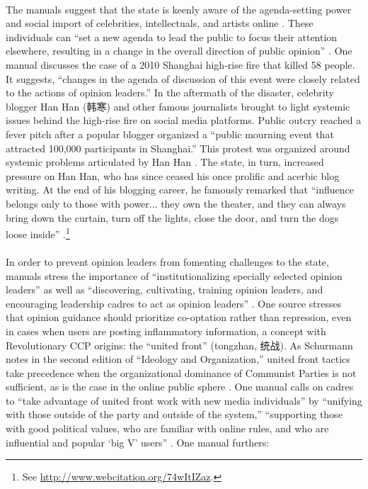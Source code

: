 \documentclass[12pt]{article}
\begin{document}
\begin{CJK*}{UTF8}{gbsn}
\paragraph{} The manuals suggest that the state is keenly aware of the agenda-setting power and social import of celebrities, intellectuals, and artists online \citep[115-123]{dang2013wangluo}. These individuals can ``set a new agenda to lead the public to focus their attention elsewhere, resulting in a change in the overall direction of public opinion'' \citep[201-228]{zhou2011weibo}. One manual discusses the case of a 2010 Shanghai high-rise fire that killed 58 people. It suggests, ``changes in the agenda of discussion of this event were closely related to the actions of opinion leaders.'' In the aftermath of the disaster, celebrity blogger Han Han (韩寒) and other famous journalists brought to light systemic issues behind the high-rise fire on social media platforms. Public outcry reached a fever pitch after a popular blogger organized a ``public mourning event that attracted 100,000 participants in Shanghai.'' This protest was organized around systemic problems articulated by Han Han \citep[201-228]{zhou2011weibo}. The state, in turn, increased pressure on Han Han, who has since ceased his once prolific and acerbic blog writing. At the end of his blogging career, he famously remarked that ``influence belongs only to those with power... they own the theater, and they can always bring down the curtain, turn off the lights, close the door, and turn the dogs loose inside'' \citep{osnos2014age}.\footnote{See \href{http://www.webcitation.org/74wItIZaz}{http://www.webcitation.org/74wItIZaz}.}

\paragraph{} In order to prevent opinion leaders from fomenting challenges to the state, manuals stress the importance of ``institutionalizing specially selected opinion leaders'' as well as ``discovering, cultivating, training opinion leaders, and encouraging leadership cadres to act as opinion leaders'' \citep[201-228]{zhou2011weibo}. One source stresses that opinion guidance should prioritize co-optation rather than repression, even in cases when users are posting inflammatory information, a concept with Revolutionary CCP origins: the ``united front'' (tongzhan, 统战). As Schurmann notes in the second edition of ``Ideology and Organization,'' united front tactics take precedence when the organizational dominance of Communist Parties is not sufficient, as is the case in the online public sphere \citep[528]{schurmann1968ideology}. One manual calls on cadres to ``take advantage of united front work with new media individuals'' by ``unifying with those outside of the party and outside of the system,'' ``supporting those with good political values,  who are familiar with online rules, and who are influential and popular `big V' users'' \citep{zhou2012buduan}. One manual furthers:


\end{CJK*}
\end{document}
